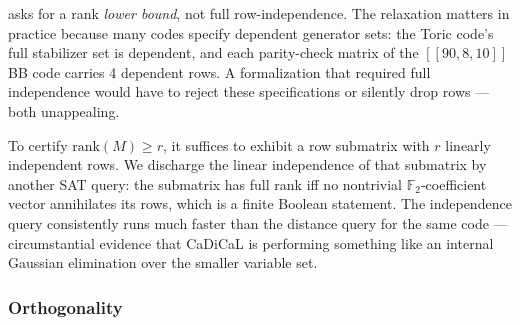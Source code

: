  asks for a rank \emph{lower bound}, not full row-independence. The
relaxation matters in practice because many codes specify dependent generator
sets: the Toric code's full stabilizer set is dependent, and each parity-check
matrix of the $[[90, 8, 10]]$ BB code carries 4 dependent rows. A formalization
that required full independence would have to reject these specifications or
silently drop rows --- both unappealing.

To certify $\mathrm{rank}(M) \geq r$, it suffices to exhibit a row submatrix
with $r$ linearly independent rows. We discharge the linear independence of that
submatrix by another SAT query: the submatrix has full rank iff no nontrivial
$\mathbb{F}_2$-coefficient vector annihilates its rows, which is a finite
Boolean statement. The independence query consistently runs much faster than the
distance query for the same code --- circumstantial evidence that CaDiCaL is
performing something like an internal Gaussian elimination over the smaller
variable set.

\subsubsection{Orthogonality}
\label{sec:orth-check}

%
%

